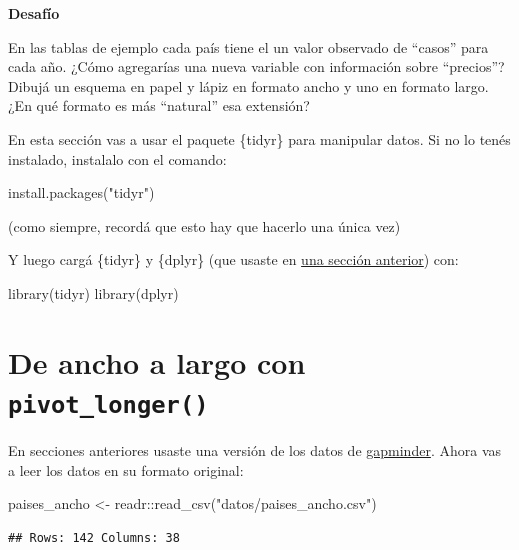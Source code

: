 \documentclass[
  openany]{book}
\newenvironment{Shaded}{\begin{snugshade}}{\end{snugshade}}
\newcommand{\FunctionTok}[1]{\textcolor[rgb]{0.00,0.00,0.00}{#1}}
\newcommand{\NormalTok}[1]{#1}
\newcommand{\OtherTok}[1]{\textcolor[rgb]{0.56,0.35,0.01}{#1}}
\newcommand{\SpecialCharTok}[1]{\textcolor[rgb]{0.00,0.00,0.00}{#1}}
\newcommand{\StringTok}[1]{\textcolor[rgb]{0.31,0.60,0.02}{#1}}
\begin{document}
\textbf{Desafío}

En las tablas de ejemplo cada país tiene el un valor observado de ``casos'' para cada año.
¿Cómo agregarías una nueva variable con información sobre ``precios''?
Dibujá un esquema en papel y lápiz en formato ancho y uno en formato largo.
¿En qué formato es más ``natural'' esa extensión?

En esta sección vas a usar el paquete \{tidyr\} para manipular datos.
Si no lo tenés instalado, instalalo con el comando:

\begin{Shaded}
\begin{Highlighting}[]
\FunctionTok{install.packages}\NormalTok{(}\StringTok{"tidyr"}\NormalTok{)}
\end{Highlighting}
\end{Shaded}

(como siempre, recordá que esto hay que hacerlo una única vez)

Y luego cargá \{tidyr\} y \{dplyr\} (que usaste en \href{05-dplyr-I.html}{una sección anterior}) con:

\begin{Shaded}
\begin{Highlighting}[]
\FunctionTok{library}\NormalTok{(tidyr)}
\FunctionTok{library}\NormalTok{(dplyr)}
\end{Highlighting}
\end{Shaded}

\hypertarget{de-ancho-a-largo-con-pivot_longer}{%
\section{\texorpdfstring{De ancho a largo con \texttt{pivot\_longer()}}{De ancho a largo con pivot\_longer()}}\label{de-ancho-a-largo-con-pivot_longer}}

En secciones anteriores usaste una versión de los datos de \href{https://www.gapminder.org/}{gapminder}.
Ahora vas a leer los datos en su formato original:

\begin{Shaded}
\begin{Highlighting}[]
\NormalTok{paises\_ancho }\OtherTok{\textless{}{-}}\NormalTok{ readr}\SpecialCharTok{::}\FunctionTok{read\_csv}\NormalTok{(}\StringTok{"datos/paises\_ancho.csv"}\NormalTok{)}
\end{Highlighting}
\end{Shaded}

\begin{verbatim}
## Rows: 142 Columns: 38
\end{verbatim}
\end{document}
